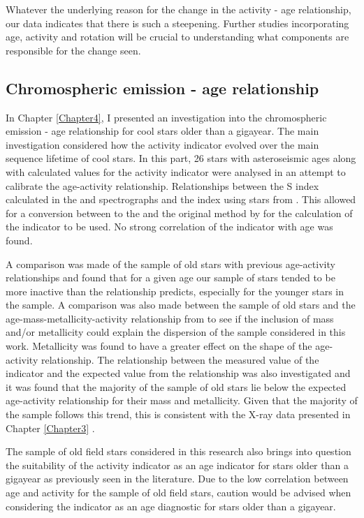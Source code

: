 Whatever the underlying reason for the change in the activity - age relationship, our data indicates that there is such a steepening. Further studies incorporating age, activity and rotation will be crucial to understanding what components are responsible for the change seen.

\subsection{Chromospheric emission - age relationship}

In Chapter \ref{Chapter4}, I presented an investigation into the chromospheric emission - age relationship for cool stars older than a gigayear. The main investigation considered how the \Rprime activity indicator evolved over the main sequence lifetime of cool stars. In this part, 26 stars with asteroseismic ages along with calculated values for the \Rprime activity indicator were analysed in an attempt to calibrate the age-activity relationship. Relationships between the S index calculated in the \esp and \narval spectrographs and the \Smw index using stars from \cite{Duncan_etal_1991}. This allowed  for a conversion between to the \Smw and the original method by \citet{Noyes_etal_1984} for the calculation of the \Rprime indicator to be used. No strong correlation of the \Rprime indicator with age was found.

A comparison was made of the sample of old stars with previous age-activity relationships and found that for a given age our sample of stars tended to be more inactive than the relationship predicts, especially for the younger stars in the sample. A comparison was also made between the sample of old stars and the age-mass-metallicity-activity relationship from \citet{Lorenzo_Oliveira_etal_2016} to see if the inclusion of mass and/or metallicity could explain the dispersion of the sample considered in this work. Metallicity was found to have a greater effect on the shape of the age-activity relationship. The relationship between the measured value of the \Rprime indicator and the expected value from the \citet{Lorenzo_Oliveira_etal_2016} relationship was also investigated and it was found that the majority of the sample of old stars lie below the expected age-activity relationship for their mass and metallicity. Given that the majority of the sample follows this trend, this is consistent with the X-ray data presented in Chapter \ref{Chapter3} \citep{Booth_etal_2017}.

The sample of old field stars considered in this research also brings into question the suitability of the \Rprime activity indicator as an age indicator for stars older than a gigayear as previously seen in the literature. Due to the low correlation between age and activity for the sample of old field stars, caution would be advised when considering the \Rprime indicator as an age diagnostic for stars older than a gigayear.

